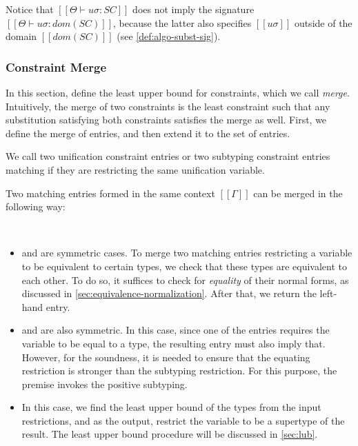 \documentclass[acmsmall,natbib=false,review,anonymous]{acmart}
\begin{document}
Notice that $[[Θ ⊢ uσ : SC]]$ does not 
imply the signature $[[Θ ⊢ uσ : dom(SC)]]$, because 
the latter also specifies $[[uσ]]$ outside of the domain $[[dom(SC)]]$
(see \cref{def:algo-subst-sig}).


\subsubsection{Constraint Merge}
\label{sec:constraint-merge}

In this section, define the least upper bound 
for constraints, which we call \emph{merge}.
Intuitively, the merge of two constraints is the least
constraint such that any substitution satisfying both constraints
satisfies the merge as well.
First, we define the merge of entries,
and then extend it to the set of entries.

\begin{definition} 
  We call two unification constraint entries 
  or two subtyping constraint entries matching 
  if they are restricting the same unification variable.
\end{definition}

Two matching entries formed in the same context $[[Γ]]$ 
can be merged in the following way:
\begin{algorithm}
  \label{definition:merge-matching-entries}
   \hfill 

  \ottdefnSCME\\
\end{algorithm}

\begin{itemize}
  \item {} and 
    are symmetric cases. To merge two matching entries restricting
    a variable to be equivalent to certain types, we check
    that these types are equivalent to each other.
    To do so, it suffices to check for \emph{equality} of their normal forms,
    as discussed in \cref{sec:equivalence-normalization}. 
    After that, we return the left-hand entry.

  \item {} and 
    are also symmetric. 
    In this case,
    since one of the entries requires the variable to be equal to 
    a type, the resulting entry must also imply that.
    However, for the soundness, it is needed to ensure that
    the equating restriction is stronger than the subtyping restriction.
    For this purpose, the premise invokes the positive subtyping.

  \item {} 
    In this case, we find the least upper bound of the types from the input
    restrictions, 
    and as the output, restrict the variable to be a supertype of the result.
    The least upper bound procedure will be discussed in \cref{sec:lub}.
\end{itemize}
\end{document}
